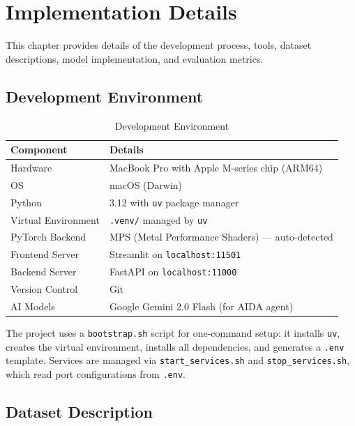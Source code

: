 \documentclass[12pt]{report}
\begin{document}
\newpage

\chapter{Implementation Details}

This chapter provides details of the development process, tools, dataset descriptions, model implementation, and evaluation metrics.

\section{Development Environment}

\begin{table}[H]
\centering
\caption{Development Environment}
\begin{tabular}{l l}
\toprule
\textbf{Component} & \textbf{Details} \\
\midrule
Hardware & MacBook Pro with Apple M-series chip (ARM64) \\
OS & macOS (Darwin) \\
Python & 3.12 with \texttt{uv} package manager \\
Virtual Environment & \texttt{.venv/} managed by \texttt{uv} \\
PyTorch Backend & MPS (Metal Performance Shaders) --- auto-detected \\
Frontend Server & Streamlit on \texttt{localhost:11501} \\
Backend Server & FastAPI on \texttt{localhost:11000} \\
Version Control & Git \\
AI Models & Google Gemini 2.0 Flash (for AIDA agent) \\
\bottomrule
\end{tabular}
\end{table}

The project uses a \texttt{bootstrap.sh} script for one-command setup: it installs \texttt{uv}, creates the virtual environment, installs all dependencies, and generates a \texttt{.env} template. Services are managed via \texttt{start\_services.sh} and \texttt{stop\_services.sh}, which read port configurations from \texttt{.env}.

\section{Dataset Description}
\end{document}
